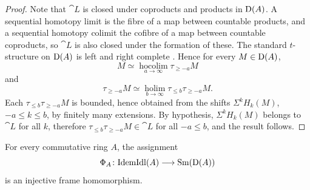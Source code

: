 \documentclass{amsart}
\begin{document}
\begin{proof}
    Note that $\cat L$ is closed under coproducts and products in $\operatorname{D}(A)$. A sequential homotopy limit is the fibre of a map between countable products, and a sequential homotopy colimit the cofibre of a map between countable coproducts, so $\cat L$ is also closed under the formation of these. The standard $t$-structure on $\operatorname{D}(A)$ is left and right complete \cite[Proposition~7.1.1.13]{HALurie}. Hence for every $M\in\operatorname{D}(A)$,
    \[
        M \simeq \operatorname*{hocolim}_{a\to\infty} \tau_{\geq-a}M
    \]
        and
    \[
        \tau_{\geq-a} M \simeq \operatorname*{holim}_{b\to\infty} \tau_{\leq b} \tau_{\geq-a} M .
    \]
    Each $\tau_{\leq b}\tau_{\geq-a}M$ is bounded, hence obtained from the shifts $\Sigma^kH_k(M)$, $-a\leq k\leq b$, by finitely many extensions. By hypothesis, $\Sigma^kH_k(M)$ belongs to $\cat L$  for all $k$, therefore $\tau_{\leq b}\tau_{\geq-a}M \in \cat L$ for all $-a \leq b$, and the result follows.
\end{proof}
    \begin{Thm}\label{thm:frame-embedding}
        For every commutative ring $A$, the assignment
        \[
            \Phi_A\colon \mathrm{IdemIdl}(A)\longrightarrow\operatorname{Sm}(\operatorname{D}(A))
        \]
        is an injective frame homomorphism.
    \end{Thm}
\end{document}
